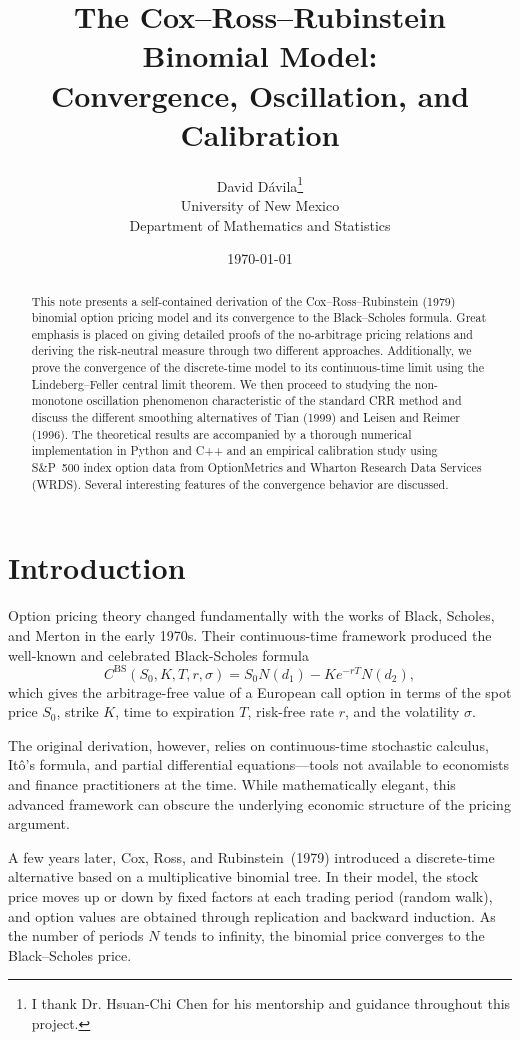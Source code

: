 \documentclass[11pt,a4paper]{article}
\title{The Cox--Ross--Rubinstein Binomial Model:\\
       Convergence, Oscillation, and Calibration}
\author{David Dávila\thanks{I thank Dr. Hsuan-Chi Chen for his mentorship and guidance throughout this project.}\\
        \small University of New Mexico\\
        \small Department of Mathematics and Statistics}
\date{\today}
\theoremstyle{plain}
\theoremstyle{definition}
\begin{document}
\maketitle

\begin{abstract}
\noindent
This note presents a self-contained derivation of the Cox--Ross--Rubinstein
(1979) binomial option pricing model and its convergence to the
Black--Scholes formula. Great emphasis is placed on giving detailed proofs of the no-arbitrage pricing relations and deriving the risk-neutral measure through two different approaches. Additionally, we prove the convergence of the discrete-time model to its continuous-time limit using the Lindeberg--Feller central limit theorem. We then proceed to studying the non-monotone oscillation phenomenon characteristic of the standard CRR method and discuss the different smoothing alternatives of Tian (1999) and Leisen and Reimer (1996). The theoretical results are accompanied by a thorough numerical implementation in Python and C++ and an empirical calibration study using S\&P~500 index option data from OptionMetrics and Wharton Research Data Services (WRDS). Several interesting features of the convergence behavior are discussed.
\end{abstract}

\tableofcontents

\section{Introduction}
\label{sec:intro}

Option pricing theory changed fundamentally with the works of Black, Scholes, and Merton in the early 1970s. Their continuous-time framework produced the well-known and celebrated Black-Scholes formula
\[
C^{\mathrm{BS}}(S_0, K, T, r, \sigma)
= S_0 N(d_1) - K e^{-rT} N(d_2),
\]
which gives the arbitrage-free value of a European call option in terms of the spot price $S_0$, strike $K$, time to expiration $T$, risk-free rate $r$, and the volatility $\sigma$. 

The original derivation, however, relies on continuous-time stochastic calculus, It\^o's formula, and partial differential equations---tools not available to economists and finance practitioners at the time. While mathematically elegant, this advanced framework can obscure the underlying economic structure of the pricing argument. 

A few years later, Cox, Ross, and Rubinstein~(1979) introduced a discrete-time alternative based on a multiplicative binomial tree. In their model, the stock price moves up or down by fixed factors at each trading period (random walk), and option values are obtained through replication and backward induction. As the number of periods $N$ tends to infinity, the binomial price converges to the Black--Scholes price.
\end{document}
